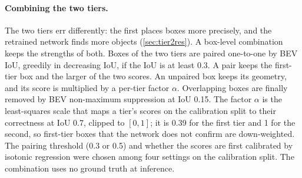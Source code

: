 \paragraph{Combining the two tiers.}
The two tiers err differently: the first places boxes more precisely, and the retrained network finds more objects (\cref{sec:tier2res}).
A box-level combination keeps the strengths of both.
Boxes of the two tiers are paired one-to-one by BEV IoU, greedily in decreasing IoU, if the IoU is at least 0.3.
A pair keeps the first-tier box and the larger of the two scores.
An unpaired box keeps its geometry, and its score is multiplied by a per-tier factor $\alpha$.
Overlapping boxes are finally removed by BEV non-maximum suppression at IoU 0.15.
The factor $\alpha$ is the least-squares scale that maps a tier's scores on the calibration split to their correctness at IoU 0.7, clipped to $[0,1]$; it is 0.39 for the first tier and 1 for the second, so first-tier boxes that the network does not confirm are down-weighted.
The pairing threshold (0.3 or 0.5) and whether the scores are first calibrated by isotonic regression were chosen among four settings on the calibration split.
The combination uses no ground truth at inference.
